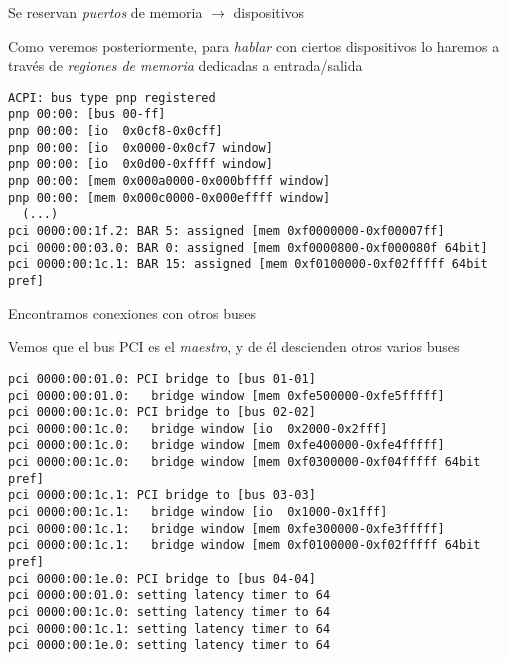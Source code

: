 \documentclass[presentation]{beamer}
\begin{document}
\begin{frame}[label={sec:org29ed3d2},fragile]{Se reservan \emph{puertos} de memoria \(\rightarrow\) dispositivos}
 \begin{center}
Como veremos posteriormente, para \emph{hablar} con ciertos dispositivos
lo haremos a través de \emph{regiones de memoria} dedicadas a
entrada/salida
\end{center}
\begin{verbatim}
ACPI: bus type pnp registered
pnp 00:00: [bus 00-ff]
pnp 00:00: [io  0x0cf8-0x0cff]
pnp 00:00: [io  0x0000-0x0cf7 window]
pnp 00:00: [io  0x0d00-0xffff window]
pnp 00:00: [mem 0x000a0000-0x000bffff window]
pnp 00:00: [mem 0x000c0000-0x000effff window]
  (...)
pci 0000:00:1f.2: BAR 5: assigned [mem 0xf0000000-0xf00007ff]
pci 0000:00:03.0: BAR 0: assigned [mem 0xf0000800-0xf000080f 64bit]
pci 0000:00:1c.1: BAR 15: assigned [mem 0xf0100000-0xf02fffff 64bit pref]
\end{verbatim}
\end{frame}

\begin{frame}[label={sec:org59aaed3},fragile]{Encontramos conexiones con otros buses}
 \begin{center}
Vemos que el bus PCI es el \emph{maestro}, y de él descienden otros varios
buses
\end{center}
\begin{verbatim}
pci 0000:00:01.0: PCI bridge to [bus 01-01]
pci 0000:00:01.0:   bridge window [mem 0xfe500000-0xfe5fffff]
pci 0000:00:1c.0: PCI bridge to [bus 02-02]
pci 0000:00:1c.0:   bridge window [io  0x2000-0x2fff]
pci 0000:00:1c.0:   bridge window [mem 0xfe400000-0xfe4fffff]
pci 0000:00:1c.0:   bridge window [mem 0xf0300000-0xf04fffff 64bit pref]
pci 0000:00:1c.1: PCI bridge to [bus 03-03]
pci 0000:00:1c.1:   bridge window [io  0x1000-0x1fff]
pci 0000:00:1c.1:   bridge window [mem 0xfe300000-0xfe3fffff]
pci 0000:00:1c.1:   bridge window [mem 0xf0100000-0xf02fffff 64bit pref]
pci 0000:00:1e.0: PCI bridge to [bus 04-04]
pci 0000:00:01.0: setting latency timer to 64
pci 0000:00:1c.0: setting latency timer to 64
pci 0000:00:1c.1: setting latency timer to 64
pci 0000:00:1e.0: setting latency timer to 64
\end{verbatim}
\end{frame}
\end{document}
